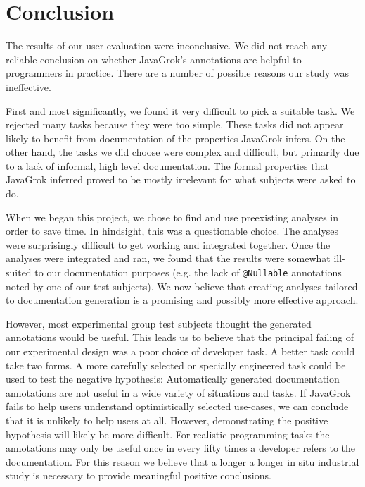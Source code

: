 \section{Conclusion}

The results of our user evaluation were inconclusive.  We did not reach any
reliable conclusion on whether JavaGrok's annotations are helpful to programmers
in practice.  There are a number of possible reasons our study was ineffective.

First and most significantly, we found it very difficult to pick a suitable
task.  We rejected many tasks because they were too simple.  These tasks did not
appear likely to benefit from documentation of the properties JavaGrok infers.
On the other hand, the tasks we did choose were complex and difficult, but primarily due
to a lack of informal, high level documentation.  The formal properties that
JavaGrok inferred proved to be mostly irrelevant for what subjects were asked to
do.

When we began this project, we chose to find and use preexisting analyses in
order to save time.  In hindsight, this was a questionable choice.  The analyses
were surprisingly difficult to get working and integrated together.  Once the
analyses were integrated and ran, we found that the results were somewhat
ill-suited to our documentation purposes (e.g. the lack of \texttt{@Nullable}
annotations noted by one of our test subjects). We now believe that creating
analyses tailored to documentation generation is a promising and possibly more effective
approach.

However, most experimental group test subjects thought the generated annotations would be
useful.  This leads us to believe that the principal failing of our experimental
design was a poor choice of developer task.  A better task could take two forms.  A more carefully
selected or specially engineered task could be used to test the negative
hypothesis:  Automatically generated documentation annotations are not useful in
a wide variety of situations and tasks.  If JavaGrok fails to help users
understand optimistically selected use-cases, we can conclude that it is
unlikely to help users at all.  However, demonstrating the positive hypothesis
will likely be more difficult.  For realistic programming tasks the annotations
may only be useful once in every fifty times a developer refers to the
documentation.  For this reason we believe that a longer a longer in situ
industrial study is necessary to provide meaningful positive conclusions.

